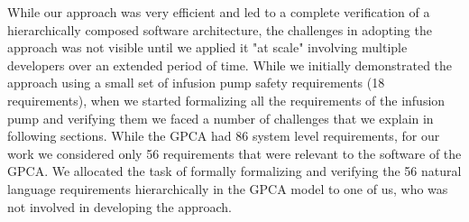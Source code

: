 While our approach was very efficient and led to a complete verification of a hierarchically composed software architecture, the challenges in adopting the approach was not visible until we applied it "at scale" involving multiple developers over an extended period of time. While we initially demonstrated the approach using a small set of infusion pump safety requirements (18 requirements), when we started formalizing all the requirements of the infusion pump and verifying them we faced a number of challenges that we explain in following sections. While the GPCA had 86 system level requirements, for our work we considered only 56 requirements that were relevant to the software of the GPCA. We allocated the task of formally formalizing and verifying the 56 natural language requirements hierarchically in the GPCA model to one of us, who was not involved in developing the approach. 


